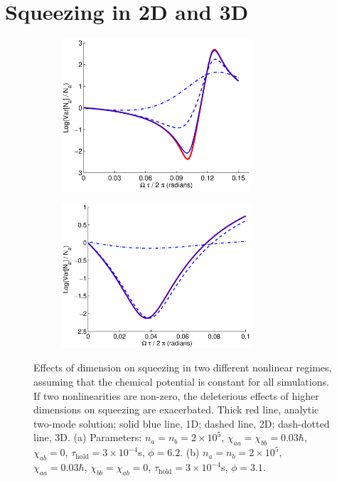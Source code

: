 \documentclass{iopart}
\begin{document}
\section{Squeezing in 2D and 3D} \label{sec:2D3Dsqueezing}

\begin{figure}
  \centering
  \begin{subfigure}{.5\textwidth}
    \centering
    \includegraphics[width=7cm]{figures/dimensional_effects_on_squeezing_1.eps}
    \label{figDimensionalSqueezingEffects:sub1}
  \end{subfigure}%
  \begin{subfigure}{.5\textwidth}
    \centering
    \includegraphics[width=7cm]{figures/dimensional_effects_on_squeezing_2.eps}
    \label{figDimensionalSqueezingEffects:sub2}
  \end{subfigure}
\caption{Effects of dimension on squeezing in two different nonlinear regimes, assuming that the chemical potential is constant for all simulations. If two nonlinearities are non-zero, the deleterious effects of higher dimensions on squeezing are exacerbated. Thick red line, analytic two-mode solution; solid blue line, 1D; dashed line, 2D; dash-dotted line, 3D. (a) Parameters: $n_a = n_b =2 \times 10^5$, $\chi_{aa}=\chi_{bb}=0.03\hbar$, $\chi_{ab}=0$, $\tau_{\mathrm{hold}}=3\times 10^{-4}$s, $\phi=6.2$. (b) $n_a = n_b =2 \times 10^5$, $\chi_{aa}=0.03\hbar$, $\chi_{bb}=\chi_{ab}=0$, $\tau_{\mathrm{hold}}=3\times 10^{-4}$s, $\phi=3.1$.}
  \label{figDimensionalSqueezingEffects}
\end{figure}
\end{document}
